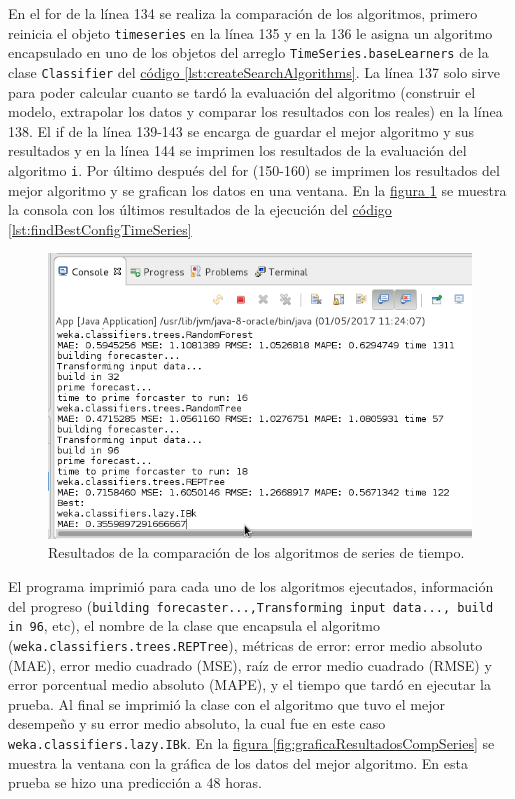 En el for de la línea 134 se realiza la comparación de los algoritmos, primero reinicia el objeto \texttt{timeseries} en la línea 135 y en la 136 
le asigna un algoritmo encapsulado en uno de los objetos del arreglo \texttt{TimeSeries.baseLearners} de la
clase \texttt{Classifier}
del \hyperref[lst:createSearchAlgorithms]{ código \ref{lst:createSearchAlgorithms}}. La línea 137 solo sirve para poder calcular cuanto se tardó la evaluación del algoritmo (construir el modelo, extrapolar los datos y comparar los resultados con los reales) en la línea 138. El if de la línea 139-143 se encarga de guardar el mejor algoritmo y sus resultados y en la línea 144 se imprimen los resultados de la evaluación del algoritmo \texttt{i}.
Por último después del for (150-160) se imprimen los resultados del mejor algoritmo y se grafican los datos en una ventana. 
En la \hyperref[fig:resultadosCompSeries]{figura \ref{fig:resultadosCompSeries}} se muestra la consola con los últimos resultados de la ejecución del \hyperref[lst:findBestConfigTimeSeries]{ código \ref{lst:findBestConfigTimeSeries}}

\begin{figure}[ht]
	\centering
	\includegraphics[width=15cm]{img/resultadosComparacionSeries.png}
	\caption{Resultados de la comparación de los algoritmos de series de tiempo.}
	\label{fig:resultadosCompSeries}
\end{figure}
El programa imprimió para cada uno de los algoritmos ejecutados, información del progreso (\texttt{building forecaster...,Transforming input data..., build in 96}, etc), el nombre de la clase que encapsula el algoritmo (\texttt{weka.classifiers.trees.REPTree}), métricas de error: error medio absoluto (MAE), error medio cuadrado (MSE), raíz de error medio cuadrado (RMSE) y error porcentual medio absoluto (MAPE), y el tiempo que tardó en ejecutar la prueba. Al final se imprimió la clase con el algoritmo que tuvo el mejor desempeño y su error medio absoluto, la cual fue en este caso \texttt{weka.classifiers.lazy.IBk}.
En la \hyperref[fig:graficaResultadosCompSeries]{figura \ref{fig:graficaResultadosCompSeries}} se muestra la ventana con la gráfica de los datos del mejor algoritmo. En esta prueba se hizo una predicción a 48 horas.

